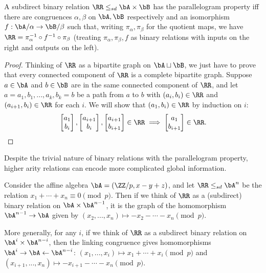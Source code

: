 \begin{prop} A subdirect binary relation $\RR \le_{sd} \bA\times \bB$ has the parallelogram property iff there are congruences $\alpha,\beta$ on $\bA,\bB$ respectively and an isomorphism $f : \bA/\alpha \rightarrow \bB/\beta$ such that, writing $\pi_{\alpha},\pi_{\beta}$ for the quotient maps, we have $\RR = \pi_{\alpha}^{-1} \circ f^{-1} \circ \pi_{\beta}$ (treating $\pi_\alpha, \pi_\beta, f$ as binary relations with inputs on the right and outputs on the left).
\end{prop}
\begin{proof} Thinking of $\RR$ as a bipartite graph on $\bA \sqcup \bB$, we just have to prove that every connected component of $\RR$ is a complete bipartite graph. Suppose $a \in \bA$ and $b \in \bB$ are in the same connected component of $\RR$, and let $a = a_1, b_1, ..., a_k, b_k = b$ be a path from $a$ to $b$ with $(a_i,b_i) \in \RR$ and $(a_{i+1},b_i) \in \RR$ for each $i$. We will show that $(a_1,b_i) \in \RR$ by induction on $i$:
\[
\begin{bmatrix} a_1\\ b_i \end{bmatrix}, \begin{bmatrix} a_{i+1}\\ b_i\end{bmatrix}, \begin{bmatrix} a_{i+1}\\ b_{i+1}\end{bmatrix} \in \RR \implies \begin{bmatrix} a_1\\ b_{i+1}\end{bmatrix} \in \RR.\qedhere
\]
\end{proof}

Despite the trivial nature of binary relations with the parallelogram property, higher arity relations can encode more complicated global information.

\begin{ex} Consider the affine algebra $\bA = (\ZZ/p, x-y+z)$, and let $\RR \le_{sd} \bA^n$ be the relation $x_1 + \cdots + x_n \equiv 0\pmod{p}$. Then if we think of $\RR$ as a (subdirect) binary relation on $\bA\times \bA^{n-1}$, it is the graph of the homomorphism $\bA^{n-1} \rightarrow \bA$ given by $(x_2, ..., x_n) \mapsto -x_2-\cdots -x_n\pmod{p}$.

More generally, for any $i$, if we think of $\RR$ as a subdirect binary relation on $\bA^i\times \bA^{n-i}$, then the linking congruence gives homomorphisms $\bA^i \rightarrow \bA \leftarrow \bA^{n-i}$: $(x_1, ..., x_i)\mapsto x_1 + \cdots + x_i\pmod{p}$ and $(x_{i+1}, ..., x_n) \mapsto -x_{i+1}-\cdots - x_n\pmod{p}$.
\end{ex}

